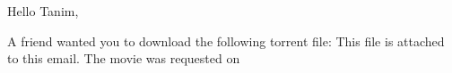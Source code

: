 \documentclass[12pt, fleqn]{article}
\begin{document}
Hello Tanim,

A friend wanted you to download the following torrent file: %
This file is attached to this email. The movie was requested on %
\end{document}
